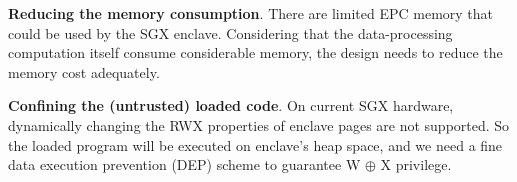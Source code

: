 {\vspace{3pt}\noindent\textbf{Reducing the memory consumption}.\label{challenge-size} 
    There are limited EPC memory that could be used by the SGX enclave. Considering that the data-processing computation itself consume considerable memory, the design needs to reduce the memory cost adequately.

\vspace{3pt}\noindent\textbf{Confining the (untrusted) loaded code}.\label{challenge-dep} On current SGX hardware, dynamically changing the RWX properties of enclave pages are not supported. So the loaded program will be executed on enclave's heap space, and we need a fine data execution prevention (DEP) scheme to guarantee W $\oplus$ X privilege.%
    
   
}
